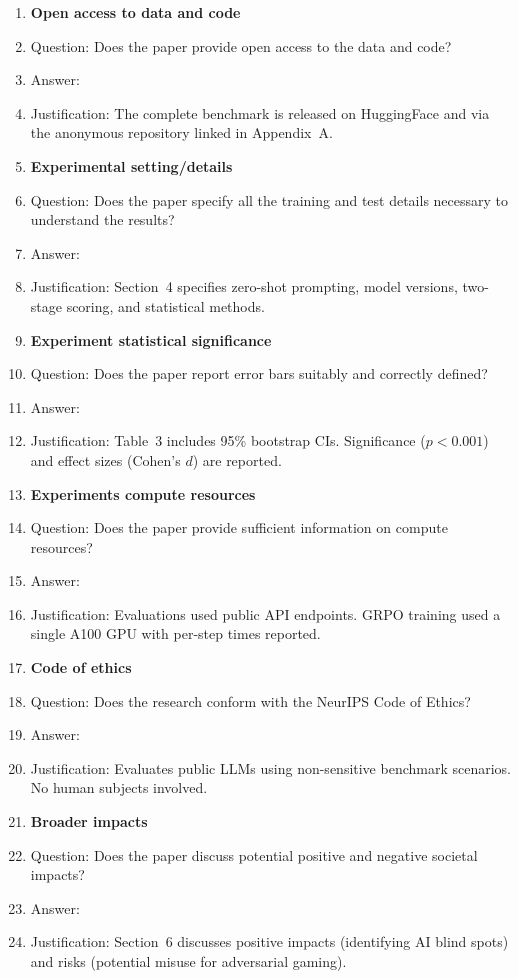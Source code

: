 \documentclass{article}
\begin{document}
\begin{enumerate}
\item {\bf Open access to data and code}
    \item[] Question: Does the paper provide open access to the data and code?
    \item[] Answer: \answerYes{}
    \item[] Justification: The complete benchmark is released on HuggingFace and via the anonymous repository linked in Appendix~A.

\item {\bf Experimental setting/details}
    \item[] Question: Does the paper specify all the training and test details necessary to understand the results?
    \item[] Answer: \answerYes{}
    \item[] Justification: Section~4 specifies zero-shot prompting, model versions, two-stage scoring, and statistical methods.

\item {\bf Experiment statistical significance}
    \item[] Question: Does the paper report error bars suitably and correctly defined?
    \item[] Answer: \answerYes{}
    \item[] Justification: Table~3 includes 95\% bootstrap CIs. Significance ($p < 0.001$) and effect sizes (Cohen's $d$) are reported.

\item {\bf Experiments compute resources}
    \item[] Question: Does the paper provide sufficient information on compute resources?
    \item[] Answer: \answerYes{}
    \item[] Justification: Evaluations used public API endpoints. GRPO training used a single A100 GPU with per-step times reported.

\item {\bf Code of ethics}
    \item[] Question: Does the research conform with the NeurIPS Code of Ethics?
    \item[] Answer: \answerYes{}
    \item[] Justification: Evaluates public LLMs using non-sensitive benchmark scenarios. No human subjects involved.

\item {\bf Broader impacts}
    \item[] Question: Does the paper discuss potential positive and negative societal impacts?
    \item[] Answer: \answerYes{}
    \item[] Justification: Section~6 discusses positive impacts (identifying AI blind spots) and risks (potential misuse for adversarial gaming).


\end{enumerate}
\end{document}
